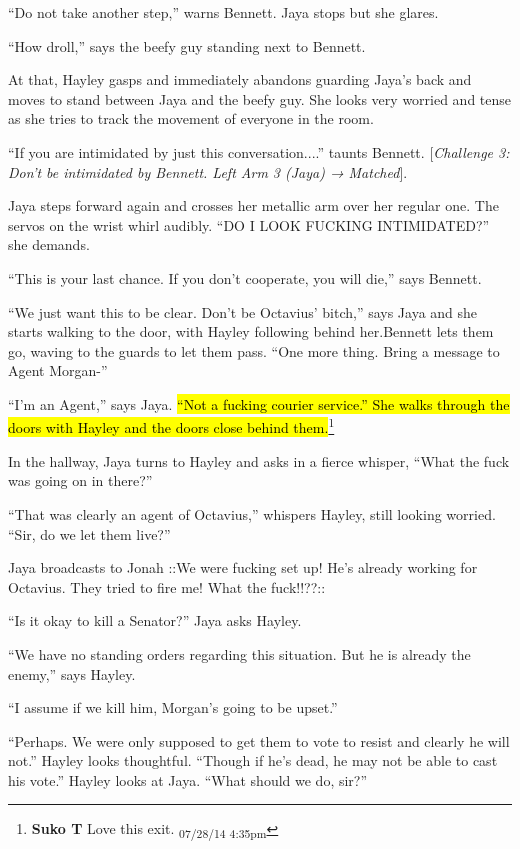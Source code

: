 ``Do not take another step,'' warns Bennett.  Jaya stops but she glares.

``How droll,'' says the beefy guy standing next to Bennett.

At that, Hayley gasps and immediately abandons guarding Jaya's back and moves to stand between Jaya and the beefy guy.  She looks very worried and tense as she tries to track the movement of everyone in the room.

``If you are intimidated by just this conversation....'' taunts Bennett. {[}\textit{Challenge 3: Don't be intimidated by Bennett.   Left Arm 3 (Jaya) → Matched}{]}.

Jaya steps forward again and crosses her metallic arm over her regular one.  The servos on the wrist whirl audibly.   ``DO I LOOK FUCKING INTIMIDATED?'' she demands.  

``This is your last chance.  If you don't cooperate, you will die,'' says Bennett.

``We just want this to be clear.  Don't be Octavius' bitch,'' says Jaya and she starts walking to the door, with Hayley following behind her.Bennett lets them go, waving to the guards to let them pass.  ``One more thing.  Bring a message to Agent Morgan-''

``I'm an Agent,'' says Jaya.  \hl{``Not a fucking courier service.''  She walks through the doors with Hayley and the doors close behind them.}\footnote{\textbf{Suko T }Love this exit. \textsubscript{07/28/14 4:35pm}}



In the hallway, Jaya turns to Hayley and asks in a fierce whisper, ``What the fuck was going on in there?''

``That was clearly an agent of Octavius,'' whispers Hayley, still looking worried.  ``Sir, do we let them live?''

Jaya broadcasts to Jonah  {\color[RGB]{255,0,0}::We were fucking set up!  He's already working for Octavius.  They tried to fire me!  What the fuck!!??::} 

``Is it okay to kill a Senator?'' Jaya asks Hayley.

``We have no standing orders regarding this situation.  But he is already the enemy,'' says Hayley.

``I assume if we kill him, Morgan's going to be upset.''

``Perhaps.  We were only supposed to get them to vote to resist and clearly he will not.''  Hayley looks thoughtful.  ``Though if he's dead, he may not be able to cast his vote.''  Hayley looks at Jaya.  ``What should we do, sir?''

